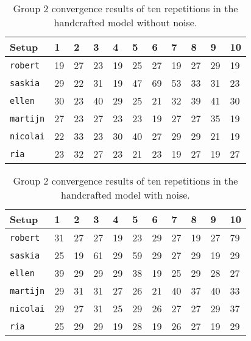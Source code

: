 \begin{table}
	\centering
	\begin{tabular}{lllllllllll}
		\hline
		\textbf{Setup} & \textbf{1} & \textbf{2} & \textbf{3} & \textbf{4} & \textbf{5} & \textbf{6} & \textbf{7} & \textbf{8} & \textbf{9} & \textbf{10} \\\hline
		\texttt{robert} & 19 & 27 & 23 & 19 & 25 & 27 & 19 & 27 & 29 & 19 \\
		\texttt{saskia} & 29 & 22 & 31 & 19 & 47 & 69 & 53 & 33 & 31 & 23 \\
		\texttt{ellen} & 30 & 23 & 40 & 29 & 25 & 21 & 32 & 39 & 41 & 30 \\
		\texttt{martijn} & 27 & 23 & 27 & 23 & 23 & 19 & 27 & 27 & 35 & 19 \\
		\texttt{nicolai} & 22 & 33 & 23 & 30 & 40 & 27 & 29 & 29 & 21 & 19 \\
		\texttt{ria} & 23 & 32 & 27 & 23 & 21 & 23 & 19 & 27 & 19 & 27 \\
	\end{tabular}
	\caption{Group 2 convergence results of ten repetitions in the handcrafted
	model without noise.}
	\label{tab:apx_conv_group2}
\end{table}
\begin{table}
	\centering
	\begin{tabular}{lllllllllll}
		\hline
		\textbf{Setup} & \textbf{1} & \textbf{2} & \textbf{3} & \textbf{4} & \textbf{5} & \textbf{6} & \textbf{7} & \textbf{8} & \textbf{9} & \textbf{10} \\\hline
		\texttt{robert} & 31 & 27 & 27 & 19 & 23 & 29 & 27 & 19 & 27 & 79 \\
		\texttt{saskia} & 25 & 19 & 61 & 29 & 59 & 29 & 27 & 29 & 19 & 29 \\
		\texttt{ellen} & 39 & 29 & 29 & 29 & 38 & 19 & 25 & 29 & 28 & 27 \\
		\texttt{martijn} & 29 & 31 & 31 & 27 & 26 & 21 & 40 & 37 & 40 & 33 \\
		\texttt{nicolai} & 29 & 27 & 31 & 25 & 29 & 26 & 27 & 27 & 29 & 37 \\
		\texttt{ria} & 25 & 29 & 29 & 19 & 28 & 19 & 26 & 27 & 19 & 29 \\
	\end{tabular}
	\caption{Group 2 convergence results of ten repetitions in the handcrafted
	model with noise.}
	\label{tab:apx_conv_group2_noise}
\end{table}
